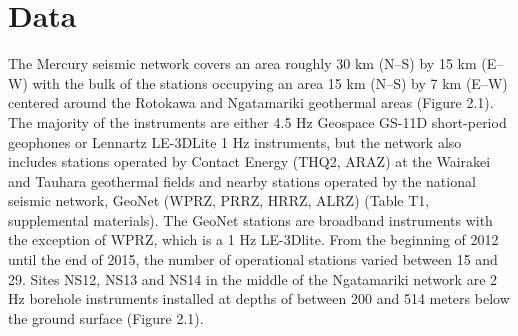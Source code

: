 \begin{table}
\centering
{}
\caption[Summary of pre-startup injection operations]{{
Table summarizing the injection operations presented here, all of which were undertaken prior to plant startup at Ngatamariki. The maximum pressures reported in the final column are for \gls{WHP_g} (\acrshort{WHP}), \gls{DHP_g} (\acrshort{DHP}) or both where present. Q denotes \gls{flow_rate} in tons / hour.}}
\label{table:operations}
\end{table}

\section{Data} \label{Data}
The Mercury seismic network covers an area roughly 30 km (N--S) by 15 km (E--W) with the bulk of the stations occupying an area 15 km (N--S) by 7 km (E--W) centered around the Rotokawa and Ngatamariki geothermal areas (Figure 2.1). The majority of the instruments are either 4.5 Hz Geospace GS-11D short-period geophones or Lennartz LE-3DLite 1 Hz instruments, but the network also includes stations operated by Contact Energy (THQ2, ARAZ) at the Wairakei and Tauhara geothermal fields and nearby stations operated by the national seismic network, GeoNet (WPRZ, PRRZ, HRRZ, ALRZ) (Table T1, supplemental materials). The GeoNet stations are broadband instruments with the exception of WPRZ, which is a 1 Hz LE-3Dlite. From the beginning of 2012 until the end of 2015, the number of operational stations varied between 15 and 29. Sites NS12, NS13 and NS14 in the middle of the Ngatamariki network are 2 Hz borehole instruments installed at depths of between 200 and 514 meters below the ground surface (Figure 2.1).

